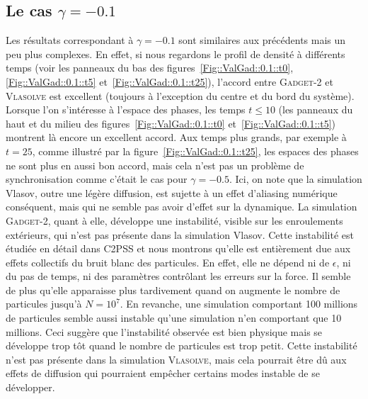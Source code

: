 		\subsection{Le cas $\gamma = -0.1$}

		Les résultats correspondant à $\gamma=-0.1$ sont similaires aux précédents mais un peu plus complexes. En effet, si nous regardons le profil de densité à
		différents temps (voir les panneaux du bas des figures~\ref{Fig::ValGad::0.1::t0}, \ref{Fig::ValGad::0.1::t5}
		et~\ref{Fig::ValGad::0.1::t25}), l'accord entre \textsc{Gadget-2} et \textsc{Vlasolve} est excellent (toujours à l'exception du centre et du bord du système). Lorsque
		l'on s'intéresse à l'espace des phases, les temps $t\leq10$ (les panneaux du haut et du milieu des figures~\ref{Fig::ValGad::0.1::t0} et~\ref{Fig::ValGad::0.1::t5})
		montrent là encore un excellent accord. Aux temps plus grands, par exemple à $t=25$, comme illustré par la figure~\ref{Fig::ValGad::0.1::t25}, 
		les espaces des phases ne sont plus en aussi bon accord, mais cela n'est pas un problème de synchronisation comme c'était le cas pour $\gamma=-0.5$.
		Ici, on note que la simulation Vlasov, outre une légère diffusion, est sujette à un effet d'aliasing numérique conséquent, mais qui ne semble pas avoir d'effet sur la
		dynamique.
		La simulation \textsc{Gadget-2}, quant à elle, développe une instabilité,
		visible sur les enroulements extérieurs, qui n'est pas présente dans la simulation Vlasov.
		Cette instabilité est étudiée en détail dans C2PSS et nous montrons qu'elle est entièrement due aux effets collectifs du bruit blanc des particules. En effet,
		elle ne dépend ni de $\epsilon$, ni du pas de temps, ni des paramètres contrôlant les erreurs sur la force.
		Il semble de plus qu'elle apparaisse plus tardivement quand on augmente le nombre de particules jusqu'à $N=10^7$. En revanche, une simulation comportant 100 millions
		de particules
		semble aussi instable qu'une simulation n'en comportant que 10 millions. Ceci suggère que l'instabilité observée est bien physique mais se développe trop tôt quand
		le nombre de particules est trop petit. Cette instabilité n'est pas présente dans la simulation \textsc{Vlasolve}, mais cela pourrait être dû aux effets de diffusion
		qui pourraient empêcher certains modes instable de se développer.


